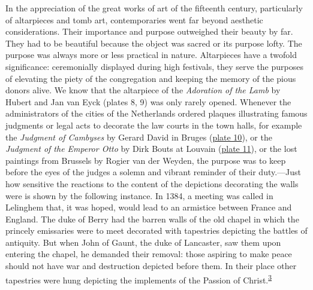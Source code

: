In the appreciation of the great works of art of the fifteenth century,
particularly of altarpieces and tomb art, contemporaries went far beyond
aesthetic considerations. Their importance and purpose outweighed their
beauty by far. They had to be beautiful because the object was sacred or
its purpose lofty. The purpose was always more or less practical in
nature. Altarpieces have a twofold significance: ceremonially displayed
during high festivals, they serve the purposes of elevating the piety of
the congregation and keeping the memory of the pious donors alive. We
know that the altarpiece of the \emph{Adoration of the Lamb} by Hubert
and Jan van Eyck (plates 8, 9) was only rarely opened. Whenever the
administrators of the cities of the Netherlands ordered plaques
illustrating famous judgments or legal acts to decorate the law courts
in the town halls, for example the \emph{Judgment of Cambyses} by Gerard
David in Bruges
(\protect\hyperlink{20_ILLUSTRATIONS_FOLLOW_PAGE.xhtmlux5cux23id_10}{plate
10}), or the \emph{Judgment of the Emperor Otto} by Dirk Bouts at
Louvain
(\protect\hyperlink{20_ILLUSTRATIONS_FOLLOW_PAGE.xhtmlux5cux23id_11}{plate
11}), or the lost paintings from Brussels by Rogier van der Weyden, the
purpose was to keep before the eyes of the judges a solemn and vibrant
reminder of their duty.---Just how sensitive the reactions to the
content of the depictions decorating the walls were is shown by the
following instance. In 1384, a meeting was called in Lelinghem that, it
was hoped, would lead to an armistice between France and England. The
duke of Berry had the barren walls of the old chapel in which the
princely emissaries were to meet decorated with tapestries depicting the
battles of antiquity. But when John of Gaunt, the duke of Lancaster, saw
them upon entering the chapel, he demanded their removal: those aspiring
to make peace should not have war and destruction depicted before them.
In their place other tapestries were hung depicting the implements of
the Passion of
Christ.\textsuperscript{\protect\hypertarget{19_Chapter_Twelve__ART_IN_LIFE.xhtmlux5cux23id_466}{\protect\hyperlink{23_NOTES.xhtmlux5cux23id_467}{3}}}

\protect\hypertarget{20_ILLUSTRATIONS_FOLLOW_PAGE.xhtml}{}{}

